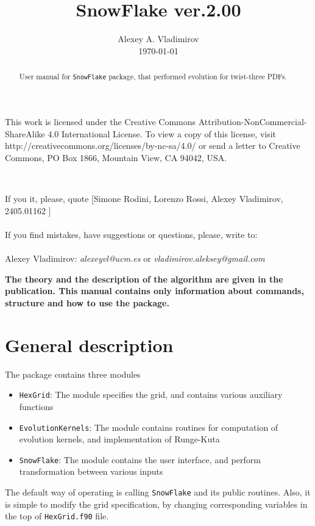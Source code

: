 \documentclass[prd,nofootinbib,eqsecnum,final]{revtex4}
\renewcommand{\(}{\left(}
\renewcommand{\)}{\right)}
\renewcommand{\[}{\left[}
\renewcommand{\]}{\right]}
\newcommand{\red}[1]{{\color[rgb]{1,0,0} #1}}
\begin{document}
\title{SnowFlake ver.2.00}
\author{Alexey A. Vladimirov \\ \today}
\noaffiliation
\begin{abstract}
User manual for \texttt{SnowFlake} package, that performed evolution for twist-three PDFs.
\center{\red{\textbf{Manual is updating.}}}
\end{abstract}
\maketitle

\begin{tcolorbox}
\begin{center}
This work is licensed under the Creative Commons Attribution-NonCommercial-ShareAlike 4.0 International License. To view a copy of this license, visit http://creativecommons.org/licenses/by-nc-sa/4.0/ or send a letter to Creative Commons, PO Box 1866, Mountain View, CA 94042, USA.

~

If you it, please, quote [Simone Rodini, Lorenzo Rossi, Alexey Vladimirov, 2405.01162 ]
\\
~
\\
If you find mistakes, have suggestions or questions, please, write to: 
\\
~
\\
Alexey Vladimirov: \textit{alexeyvl@ucm.es} or \textit{vladimirov.aleksey@gmail.com}
\end{center}
\end{tcolorbox}

\begin{center}
\textbf{The theory and the description of the algorithm are given in the publication. This manual contains only information about commands, structure and how to use the package.}
\end{center}

\section{General description}

The package contains three modules
\begin{itemize}
\item \texttt{HexGrid}: The module specifies the grid, and contains various auxiliary functions
\item \texttt{EvolutionKernels}: The module contains routines for computation of evolution kernels, and implementation of Runge-Kuta
\item \texttt{SnowFlake}: The module contains the user interface, and perform transformation between various inputs
\end{itemize}
The default way of operating is calling \texttt{SnowFlake} and its public routines. Also, it is simple to modify the grid specification, by changing corresponding variables in the top of \texttt{HexGrid.f90} file.
\end{document}
